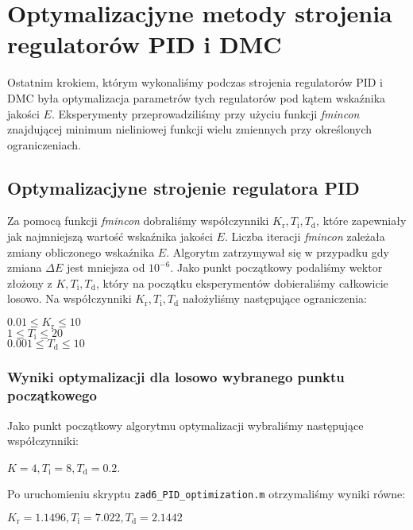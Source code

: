 \chapter{Optymalizacjyne metody strojenia regulatorów PID i DMC}
\label{zad6}
Ostatnim krokiem, którym wykonaliśmy podczas strojenia regulatorów PID i DMC 
była optymalizacja parametrów tych regulatorów pod kątem wskaźnika jakości $E$. 
Eksperymenty przeprowadziliśmy przy użyciu  
funkcji \textit{fmincon} znajdującej minimum nieliniowej funkcji wielu zmiennych 
przy określonych ograniczeniach.

\section{Optymalizacjyne strojenie regulatora PID}
\label{zad6_pid}
Za pomocą funkcji \textit{fmincon} dobraliśmy współczynniki 
$K_{\mathrm{r}}, T_{\mathrm{i}}, T_{\mathrm{d}}$, które zapewniały 
jak najmniejszą wartość wskaźnika jakości $E$. Liczba iteracji  
\textit{fmincon} zależała zmiany obliczonego wskaźnika $E$. Algorytm zatrzymywał się 
w przypadku gdy zmiana $\Delta E$ jest mniejsza od $10^{\num{-6}}$. 
Jako punkt początkowy podaliśmy wektor złożony z $K, T_{\mathrm{i}}, 
T_{\mathrm{d}}$, który na początku eksperymentów dobieraliśmy całkowicie losowo. 
Na współczynniki $K_{\mathrm{r}}, T_{\mathrm{i}}, T_{\mathrm{d}}$ nałożyliśmy następujące
ograniczenia:

\begin{center}
$\num{0.01} \leq K_{\mathrm{r}} \leq \num{10}$\\
$\num{1} \leq T_{\mathrm{i}} \leq \num{20}$\\
$\num{0,001} \leq T_{\mathrm{d}} \leq \num{10}$
\end{center}

\subsection{Wyniki optymalizacji dla losowo wybranego punktu początkowego}
\label{zad6_losowo}
Jako punkt początkowy algorytmu optymalizacji wybraliśmy następujące współczynniki: 
\begin{center}
$K = 4, {T_{\mathrm{i}} = 8}, T_{\mathrm{d}} = \num{0.2}$. 
\end{center}
Po uruchomieniu skryptu \verb+zad6_PID_optimization.m+ otrzymaliśmy 
wyniki równe:
\begin{center}
$K_{\mathrm{r}} = \num{1.1496}, T_{\mathrm{i}} = \num{7.022}, T_{\mathrm{d}} = \num{2.1442}$
\end{center}

